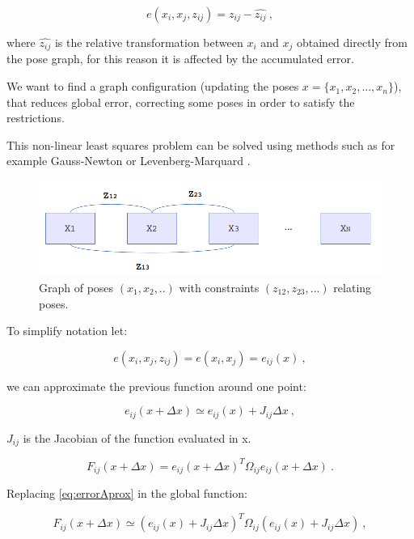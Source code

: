 $$
e(x_i,x_j,z_{ij}) = z_{ij} - \hat{z_{ij}} \ ,
$$

\noindent where $\hat{z_{ij}}$ is the relative transformation between $x_i$ and $x_j$ obtained directly from the pose graph, for this reason 
it is affected by the accumulated error.

We want to find a graph configuration (updating the poses $x=\{x_1,x_2,...,x_n\}$), that reduces global error,
 correcting some poses in order to satisfy the restrictions.

This  non-linear least squares problem can be solved using 
methods such as for example Gauss-Newton or Levenberg-Marquard \cite{numericalOptBook}.

\begin{figure}[!h]
\begin{center}
\includegraphics[scale=1.5]{images/graph_diagram2}
\caption{Graph of poses $(x_1,x_2,..)$ with constraints $(z_{12},z_{23},...)$ relating poses.}
\end{center}
\end{figure}

To simplify notation let: 

$$
e(x_i,x_j,z_{ij}) = e(x_i,x_j) = e_{ij}(x) \ ,
$$

\noindent we can approximate the previous function around one point:

\begin{equation}
\label{eq:errorAprox}
e_{ij}(x + \Delta x) \simeq e_{ij}(x) + J_{ij} \Delta x \ ,
\end{equation}

\noindent $J_{ij}$ is the Jacobian of the function evaluated in x. 


\begin{equation}
\label{eq:globalFunc}
F_{ij}(x + \Delta x) = e_{ij}(x + \Delta x)^T \Omega_{ij}  e_{ij}(x + \Delta x) \ .
\end{equation}

\noindent Replacing \ref{eq:errorAprox} in the global function:

\begin{equation}
\label{eq:globalFuncAprox}
F_{ij}(x + \Delta x) \simeq (e_{ij}(x) + J_{ij} \Delta x)^T \Omega_{ij}  (e_{ij}(x) + J_{ij} \Delta x) \ ,
\end{equation}

